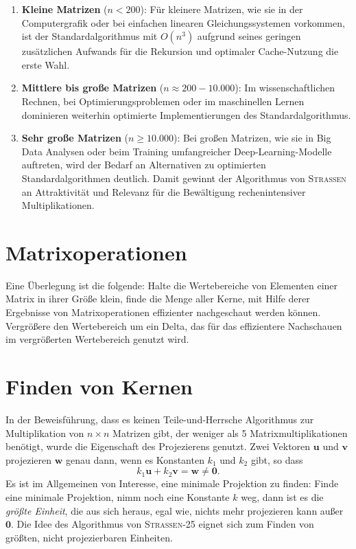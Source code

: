 \documentclass[oneside]{scrbook}
\numberwithin{equation}{section}
\begin{document}
\begin{enumerate}
	\item \textbf{Kleine Matrizen} ($n < 200$): Für kleinere Matrizen, wie sie in der Computergrafik oder bei einfachen linearen Gleichungssystemen vorkommen, ist der Standardalgorithmus mit $O(n^3)$ aufgrund seines geringen zusätzlichen Aufwands für die Rekursion und optimaler Cache-Nutzung die erste Wahl.
	
	\item \textbf{Mittlere bis große Matrizen} ($n \approx 200 - 10.000$): Im wissenschaftlichen Rechnen, bei Optimierungsproblemen oder im maschinellen Lernen dominieren weiterhin optimierte Implementierungen des Standardalgorithmus.
	
	\item \textbf{Sehr große Matrizen} ($n \ge 10.000$): Bei großen Matrizen, wie sie in Big Data Analysen oder beim Training umfangreicher Deep-Learning-Modelle auftreten, wird der Bedarf an Alternativen zu optimierten Standardalgorithmen deutlich. Damit gewinnt der Algorithmus von \textsc{Strassen} an Attraktivität und Relevanz für die Bewältigung rechenintensiver Multiplikationen.
\end{enumerate}

\section{Matrixoperationen}
Eine Überlegung ist die folgende: Halte die Wertebereiche von Elementen einer Matrix in ihrer Größe klein, finde die Menge aller Kerne, mit Hilfe derer Ergebnisse von Matrixoperationen effizienter nachgeschaut werden können. Vergrößere den Wertebereich um ein Delta, das für das effizientere Nachschauen im vergrößerten Wertebereich genutzt wird.

\section{Finden von Kernen}
In der Beweisführung, dass es keinen Teile-und-Herrsche Algorithmus zur Multiplikation von $n \times n$ Matrizen gibt, der weniger als 5 Matrixmultiplikationen benötigt, wurde die Eigenschaft des Projezierens genutzt. Zwei Vektoren $\boldsymbol{u}$ und $\boldsymbol{v}$ projezieren $\boldsymbol{w}$ genau dann, wenn es Konstanten $k_1$ und $k_2$ gibt, so dass $$k_1 \boldsymbol{u} + k_2\boldsymbol{v} = \boldsymbol{w} \neq \boldsymbol{0}.$$ Es ist im Allgemeinen von Interesse, eine minimale Projektion zu finden: Finde eine minimale Projektion, nimm noch eine Konstante $k$ weg, dann ist es die \textit{größte Einheit}, die aus sich heraus, egal wie, nichts mehr projezieren kann außer $\boldsymbol{0}$. Die Idee des Algorithmus von \textsc{Strassen-25} eignet sich zum Finden von größten, nicht projezierbaren Einheiten.
\end{document}

